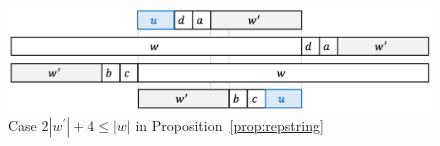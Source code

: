 \begin{figure}[t]
\begin{center}
  \includegraphics[scale=0.345]{figs/w=2w_1+4.pdf}
  \caption{Case $2|w^{\prime}| + 4 \leq |w|$ in Proposition~\ref{prop:repstring}}\label{fig:prop_pic10}
\end{center}
\end{figure}